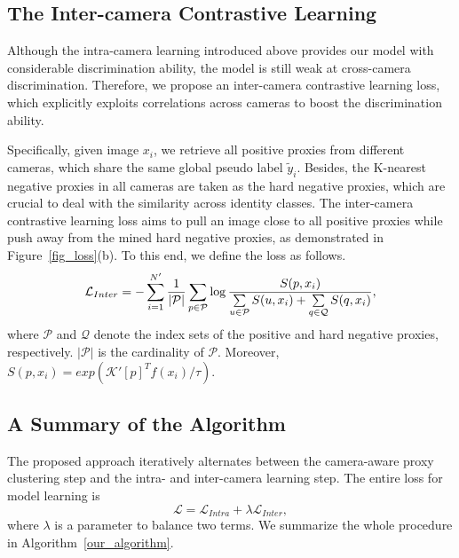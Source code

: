 \documentclass[letterpaper]{article} %
\begin{document}
\subsection{The Inter-camera Contrastive Learning}
Although the intra-camera learning introduced above provides our model with considerable discrimination ability, the model is still weak at cross-camera discrimination. Therefore, we propose an inter-camera contrastive learning loss, which explicitly exploits correlations across cameras to boost the discrimination ability. 


Specifically, given image $x_i$, we retrieve all positive proxies from different cameras, which share the same global pseudo label $\tilde{y}_i$. Besides, the K-nearest negative proxies in all cameras are taken as the hard negative proxies, which are crucial to deal with the similarity across identity classes. The inter-camera contrastive learning loss aims to pull an image close to all positive proxies while push away from the mined hard negative proxies, as demonstrated in Figure~\ref{fig_loss}(b). To this end, we define the loss as follows. 
\begin{equation}
\small
\mathcal{L}_{Inter}=-\sum_{i=1}^{N'}\frac{1}{|\mathcal{P}|}\sum_{p \in \mathcal{P}} \log \frac{S(p, x_i)}{\sum \limits_{u \in \mathcal{P}} S(u, x_i) + \sum \limits_{q \in \mathcal{Q}} S(q, x_i)},
\label{eq_global_loss}
\end{equation}
where $\mathcal{P}$ and $\mathcal{Q}$ denote the index sets of the positive and hard negative proxies, respectively. $|\mathcal{P}|$ is the cardinality of $\mathcal{P}$. Moreover, $S(p, x_i) = exp (\mathcal{K}'[p]^T f(x_i) / \tau)$.  





\subsection{A Summary of the Algorithm}
The proposed approach iteratively alternates between the camera-aware proxy clustering step and the intra- and inter-camera learning step. The entire loss for model learning is 
\begin{equation}
\mathcal{L} = \mathcal{L}_{Intra} + \lambda \mathcal{L}_{Inter},
\label{eq_overall_loss}
\end{equation}
where $\lambda$ is a parameter to balance two terms. We summarize the whole procedure in Algorithm~\ref{our_algorithm}. 
\end{document}
